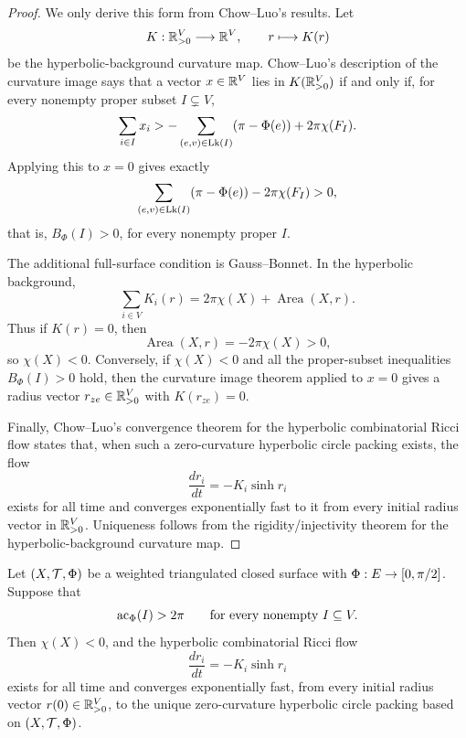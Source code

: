 \begin{proof}
We only derive this form from Chow--Luo's results.  Let
\[
  K:\mathbb R_{>0}^V\longrightarrow \mathbb R^V,\qquad r\longmapsto K(r)
\]
be the hyperbolic-background curvature map.  Chow--Luo's description of
the curvature image says that a vector $x\in\mathbb R^V$ lies in $K(\mathbb R_{>0}^V)$
if and only if, for every nonempty proper subset $I\subsetneq V$,
\[
  \sum_{i\in I}x_i
  >
  -\sum_{(e,v)\in\operatorname{Lk}(I)}(\pi-\Phi(e))+2\pi\chi(F_I).
\]
Applying this to $x=0$ gives exactly
\[
  \sum_{(e,v)\in\operatorname{Lk}(I)}(\pi-\Phi(e))-2\pi\chi(F_I)>0,
\]
that is, $B_\Phi(I)>0$, for every nonempty proper $I$.

The additional full-surface condition is Gauss--Bonnet.  In the hyperbolic
background,
\[
  \sum_{i\in V}K_i(r)=2\pi\chi(X)+\operatorname{Area}(X,r).
\]
Thus if $K(r)=0$, then
\[
  \operatorname{Area}(X,r)=-2\pi\chi(X)>0,
\]
so $\chi(X)<0$.  Conversely, if $\chi(X)<0$ and all the proper-subset
inequalities $B_\Phi(I)>0$ hold, then the curvature image theorem applied
to $x=0$ gives a radius vector $r_{ze}\in\mathbb R_{>0}^V$ with $K(r_{ze})=0$.

Finally, Chow--Luo's convergence theorem for the hyperbolic combinatorial
Ricci flow states that, when such a zero-curvature hyperbolic circle
packing exists, the flow
\[
  \frac{dr_i}{dt}=-K_i\sinh r_i
\]
exists for all time and converges exponentially fast to it from every
initial radius vector in $\mathbb R_{>0}^V$.  Uniqueness follows from the
rigidity/injectivity theorem for the hyperbolic-background curvature map.
\end{proof}

\begin{theorem}\label{thm:average-character-criterion}
\leanok
Let $(X,\mathcal T,\Phi)$ be a weighted triangulated closed surface with
$\Phi:E\to[0,\pi/2]$.  Suppose that
\[
  \operatorname{ac}_\Phi(I)>2\pi
  \qquad
  \text{for every nonempty } I\subseteq V .
\]
Then $\chi(X)<0$, and the hyperbolic combinatorial Ricci flow
\[
  \frac{dr_i}{dt}=-K_i\sinh r_i
\]
exists for all time and converges exponentially fast, from every initial
radius vector $r(0)\in\mathbb R_{>0}^{V}$, to the unique zero-curvature
hyperbolic circle packing based on $(X,\mathcal T,\Phi)$.
\end{theorem}

